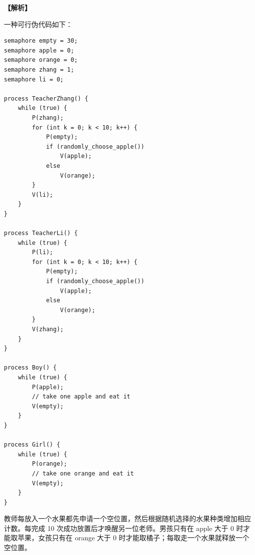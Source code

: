 \documentclass[UTF8,12pt]{ctexart}
\newenvironment{explanation}{\par\noindent\textbf{【解析】}\par\smallskip}{\par\medskip}
\begin{document}
\begin{explanation}
一种可行伪代码如下：

\begin{lstlisting}
semaphore empty = 30;
semaphore apple = 0;
semaphore orange = 0;
semaphore zhang = 1;
semaphore li = 0;

process TeacherZhang() {
    while (true) {
        P(zhang);
        for (int k = 0; k < 10; k++) {
            P(empty);
            if (randomly_choose_apple())
                V(apple);
            else
                V(orange);
        }
        V(li);
    }
}

process TeacherLi() {
    while (true) {
        P(li);
        for (int k = 0; k < 10; k++) {
            P(empty);
            if (randomly_choose_apple())
                V(apple);
            else
                V(orange);
        }
        V(zhang);
    }
}

process Boy() {
    while (true) {
        P(apple);
        // take one apple and eat it
        V(empty);
    }
}

process Girl() {
    while (true) {
        P(orange);
        // take one orange and eat it
        V(empty);
    }
}
\end{lstlisting}

教师每放入一个水果都先申请一个空位置，然后根据随机选择的水果种类增加相应计数。每完成 10 次成功放置后才唤醒另一位老师。男孩只有在 apple 大于 0 时才能取苹果，女孩只有在 orange 大于 0 时才能取橘子；每取走一个水果就释放一个空位置。
\end{explanation}
\end{document}
